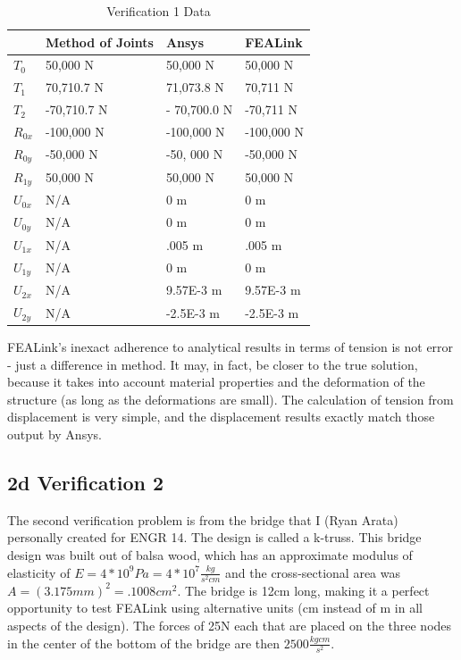 \documentclass[11pt, oneside]{article}   	%
\begin{document}
\begin{table}
\centering
\caption{Verification 1 Data}
\label{table:V1}
\begin{tabular}{l|l|l|l}
          & Method of Joints & Ansys        & FEALink    \\ \hline
$T_0$      & 50,000 N         & 50,000 N     & 50,000 N   \\
$T_1$      & 70,710.7 N       & 71,073.8 N   & 70,711 N   \\
$T_2$      & -70,710.7 N      & - 70,700.0 N & -70,711 N  \\
$R_{0x}$ & -100,000 N       & -100,000 N   & -100,000 N \\
$R_{0y}$ & -50,000 N        & -50, 000 N   & -50,000 N  \\
$R_{1y}$ & 50,000 N         & 50,000 N     & 50,000 N   \\
$U_{0x}$ & N/A              & 0 m           & 0 m         \\
$U_{0y}$ & N/A              & 0 m           & 0 m         \\
$U_{1x}$ & N/A              & .005 m        & .005 m      \\
$U_{1y}$ & N/A              & 0 m           & 0 m         \\
$U_{2x}$ & N/A              & 9.57E-3 m     & 9.57E-3 m   \\
$U_{2y}$ & N/A              & -2.5E-3 m     & -2.5E-3 m  
\end{tabular}
\end{table}

FEALink's inexact adherence to analytical results in terms of tension is not error - just a difference in method. It may, in fact, be closer to the true solution, because it takes into account material properties and the deformation of the structure (as long as the deformations are small).  The calculation of tension from displacement is very simple, and the displacement results exactly match those output by Ansys.


\subsection{2d Verification 2}
The second verification problem is from the bridge that I (Ryan Arata) personally created for ENGR 14.  The design is called a k-truss.  This bridge design was built out of balsa wood, which has an approximate modulus of elasticity of $ E = 4*10^9 Pa = 4*10^7 \frac{kg}{s^2 cm} $ and the cross-sectional area was $ A = (3.175 mm)^2 = .1008 cm^2 $.  The bridge is 12cm long, making it a perfect opportunity to test FEALink using alternative units (cm instead of m in all aspects of the design).  The forces of 25N each that are placed on the three nodes in the center of the bottom of the bridge are then $ 2500 \frac{kg cm}{s^2} $. 
\end{document}
